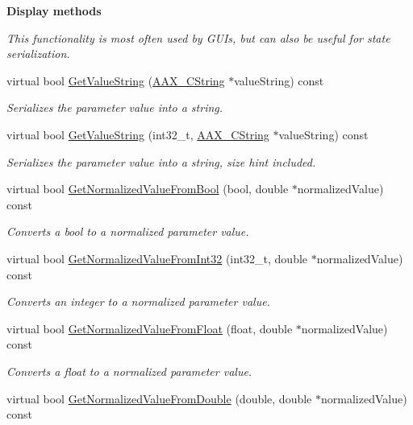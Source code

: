 \begin{Indent}{\bf Display methods}\par
{\em This functionality is most often used by G\+U\+Is, but can also be useful for state serialization. }\begin{DoxyCompactItemize}
\item 
virtual bool \hyperlink{a00040_a5932678cfecf92e3601d8ac014bee0ec}{Get\+Value\+String} (\hyperlink{a00042}{A\+A\+X\+\_\+\+C\+String} $\ast$value\+String) const 
\begin{DoxyCompactList}\small\item\em Serializes the parameter value into a string. \end{DoxyCompactList}\item 
virtual bool \hyperlink{a00040_a543cf8c2931f940c8eec2d86994f2c40}{Get\+Value\+String} (int32\+\_\+t, \hyperlink{a00042}{A\+A\+X\+\_\+\+C\+String} $\ast$value\+String) const 
\begin{DoxyCompactList}\small\item\em Serializes the parameter value into a string, size hint included. \end{DoxyCompactList}\item 
virtual bool \hyperlink{a00040_a5fbe02b5c7545e5b53d0d538692ccfb6}{Get\+Normalized\+Value\+From\+Bool} (bool, double $\ast$normalized\+Value) const 
\begin{DoxyCompactList}\small\item\em Converts a bool to a normalized parameter value. \end{DoxyCompactList}\item 
virtual bool \hyperlink{a00040_a33de9218130a205b6b8433a1cebc50df}{Get\+Normalized\+Value\+From\+Int32} (int32\+\_\+t, double $\ast$normalized\+Value) const 
\begin{DoxyCompactList}\small\item\em Converts an integer to a normalized parameter value. \end{DoxyCompactList}\item 
virtual bool \hyperlink{a00040_a2e3f85ea96f9196fd45ddda182500d0e}{Get\+Normalized\+Value\+From\+Float} (float, double $\ast$normalized\+Value) const 
\begin{DoxyCompactList}\small\item\em Converts a float to a normalized parameter value. \end{DoxyCompactList}\item 
virtual bool \hyperlink{a00040_a66e75e0bd1c4b7179482fa84578539c6}{Get\+Normalized\+Value\+From\+Double} (double, double $\ast$normalized\+Value) const 

\end{DoxyCompactItemize}
\end{Indent}
